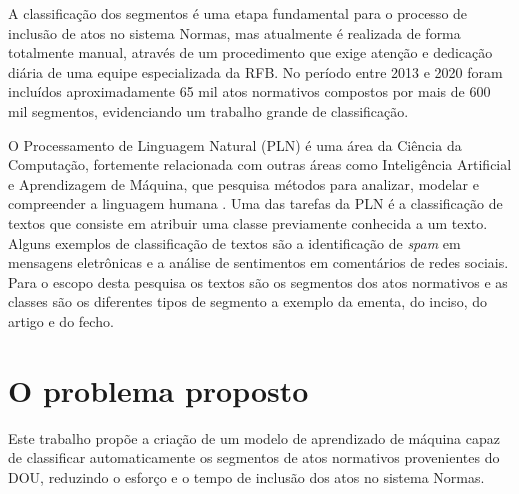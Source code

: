 A classificação dos segmentos é uma etapa fundamental para o processo de inclusão de atos no sistema Normas, mas atualmente é realizada de forma totalmente manual, através de um procedimento que exige atenção e dedicação diária de uma equipe especializada da RFB. No período entre 2013 e 2020 foram incluídos aproximadamente 65 mil atos normativos compostos por mais de 600 mil segmentos, evidenciando um trabalho grande de classificação.

O Processamento de Linguagem Natural (PLN) é uma área da Ciência da Computação, fortemente relacionada com outras áreas como Inteligência Artificial e Aprendizagem de Máquina, que pesquisa métodos para analizar, modelar e compreender a linguagem humana \cite{PracticalNLP2020}. Uma das tarefas da PLN é a classificação de textos que consiste em atribuir uma classe previamente conhecida a um texto. Alguns exemplos de classificação de textos são a identificação de \textit{spam} em mensagens eletrônicas e a análise de sentimentos em comentários de redes sociais. Para o escopo desta pesquisa os textos são os segmentos dos atos normativos e as classes são os diferentes tipos de segmento a exemplo da ementa, do inciso, do artigo e do fecho. 

\section{O problema proposto}

Este trabalho propõe a criação de um modelo de aprendizado de máquina capaz de classificar automaticamente os segmentos de atos normativos provenientes do DOU, reduzindo o esforço e o tempo de inclusão dos atos no sistema Normas.     

